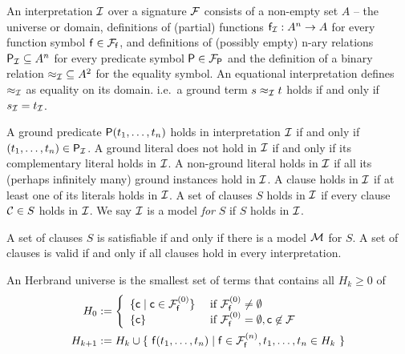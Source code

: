 \begin{definition}
	An {\myem interpretation} ${\mathcal I}$ over a signature ${\mathcal F}$ consists of a
	non-empty set $A$ -- the {\myem universe} or {\myem domain},
	definitions of (partial) functions ${\mathsf f}_{\mathcal I}: A^n\rightarrow A$ for every function symbol ${\mathsf f}\in{{\mathcal F}_{\mathsf f}}$, 
	and definitions of (possibly empty) n-ary relations 
	 ${{\mathsf P}_{\mathcal I}}\subseteq A^n$ for every predicate symbol ${\mathsf P}\in{{\mathcal F}_{\mathsf P}}$
	 and the definition of a binary relation ${\approx_{\mathcal I}}\subseteq A^2$ for the equality symbol.
	 An {\myem equational} interpretation defines $\approx_{\mathcal I}$ as equality on its domain.
	 i.e.~a ground term $s \approx_{\mathcal I} t$ holds if and only if $s_{\mathcal I} = t_{\mathcal I}$.
	
	A ground predicate ${\mathsf P}(t_1,\ldots,t_n)$ {\myem holds} in interpretation ${\mathcal I}$ 
	if and only if $(t_1,\ldots,t_n) \in {\mathsf P}_{\mathcal I}$.
	A ground literal does not hold in ${\mathcal I}$ if and only if its complementary literal holds in ${\mathcal I}$.
%	
	A non-ground literal holds in ${\mathcal I}$ if all its 
	(perhaps infinitely many) ground
	instances hold in ${\mathcal I}$.
	A clause holds in ${\mathcal I}$ if at least one of its literals holds in ${\mathcal I}$.
	A set of clauses $S$ holds in ${\mathcal I}$ if every clause ${\mathcal C}\in S$ holds in ${\mathcal I}$.
	We say ${\mathcal I}$ is a model {\em for} $S$ if $S$ holds in ${\mathcal I}$. 
	
	
\end{definition}

\begin{definition}
	A set of clauses $S$ is {\myem satisfiable} if and only if there is a model ${\mathcal M}$ for $S$. 
	A set of clauses is  {\myem valid} if and only if all clauses hold in every interpretation.
\end{definition}

\begin{definition}\label{def:hk}
	An {\myem Herbrand universe} is the smallest set of terms that contains all $H_k\ge 0$ of
	\begin{align*}
	H_0 &:= \left\{ 
	\begin{array}{ll}
	\{ \mc \mid \mc\in\mcFfn[0] \} 
	&\text{if } \mcFfn[0]\not=\emptyset\\
	\{ \mc \}
	&\text{if } \mcFfn[0]=\emptyset, \mc\not\in\mcF
	\end{array}
	\right. 
	\\
	H_{k+1} &:= H_k \cup \{\  
	\mf(t_1,\ldots,t_n) \mid
	\mf\in\mcFfn[n],
	t_1,\ldots,t_n \in H_k
	\ \}
	\end{align*}
	
\end{definition}


